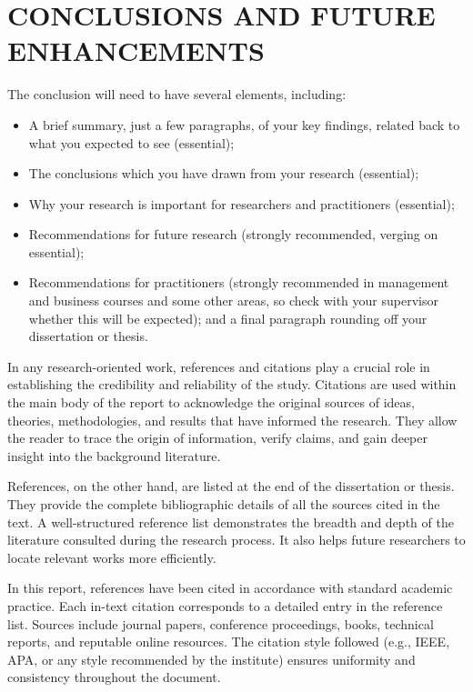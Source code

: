 \chapter{\uppercase{Conclusions and Future Enhancements}}
The conclusion will need to have several elements, including:

\begin{itemize}
    \item A brief summary, just a few paragraphs, of your key findings, related back to what you expected to see (essential);
    \item The conclusions which you have drawn from your research (essential);
    \item Why your research is important for researchers and practitioners (essential);
    \item Recommendations for future research (strongly recommended, verging on essential);
    \item Recommendations for practitioners (strongly recommended in management and business courses and some other areas, so check with your supervisor whether this will be expected); and a final paragraph rounding off your dissertation or thesis.
\end{itemize}

In any research-oriented work, references and citations play a crucial role in establishing the credibility and reliability of the study. Citations are used within the main body of the report to acknowledge the original sources of ideas, theories, methodologies, and results that have informed the research. They allow the reader to trace the origin of information, verify claims, and gain deeper insight into the background literature\cite{waldron2003generalized}.

References, on the other hand, are listed at the end of the dissertation or thesis. They provide the complete bibliographic details of all the sources cited in the text. A well-structured reference list demonstrates the breadth and depth of the literature consulted during the research process. It also helps future researchers to locate relevant works more efficiently\cite{kothari2004research}.

In this report, references have been cited in accordance with standard academic practice. Each in-text citation corresponds to a detailed entry in the reference list. Sources include journal papers, conference proceedings, books, technical reports, and reputable online resources. The citation style followed (e.g., IEEE, APA, or any style recommended by the institute) ensures uniformity and consistency throughout the document\cite{haykin2005cognitive}.
